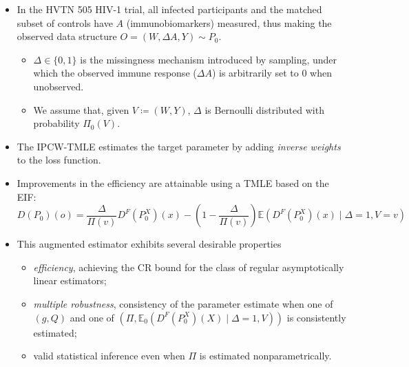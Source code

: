 \documentclass[landscape,a0paper,fontscale=0.285]{baposter} %
\begin{document}
\begin{poster}
{\vspace{-0.35em}
\begin{itemize}
\itemsep0pt
\item In the HVTN 505 HIV-1 trial, all infected participants and the matched
  subset of controls have $A$ (immunobiomarkers) measured, thus making the
  observed data structure \textbf{$O = (W, \Delta A, Y) \sim P_0$}.
  \vspace{-0.25em}
  \begin{itemize}
    \itemsep0pt
    \item $\Delta \in \{0, 1\}$ is the missingness mechanism introduced
      by sampling, under which the observed immune response ($\Delta A$) is
      arbitrarily set to $0$ when unobserved.
    \item We assume that, given $V \coloneqq (W, Y)$, $\Delta$ is Bernoulli
      distributed with probability $\Pi_0(V)$.
  \end{itemize}
\item The IPCW-TMLE \cite{rose2011targeted2sd} estimates the target parameter by
  adding \textit{inverse weights} to the loss function.
\item Improvements in the efficiency are attainable using a TMLE based on the
  EIF:
  $$ D(P_0)(o) = \frac{\Delta}{\Pi(v)} D^F(P_0^X)(x) - \left(1 -
    \frac{\Delta}{\Pi(v)}\right)\mathbb{E}(D^F(P_0^X)(x) \mid \Delta = 1,
    V = v)$$
\item This augmented estimator exhibits several desirable properties
  \vspace{-0.25em}
  \begin{itemize}
    \itemsep0pt
    \item \textit{efficiency}, achieving the CR bound for the class of regular
      asymptotically linear estimators;
    \item \textit{multiple robustness}, consistency of the parameter estimate
      when one of $(g, Q)$ and one of $(\Pi, \mathbb{E}_0(D^F(P_0^X)(X) \mid
      \Delta = 1, V))$ is consistently estimated;
    \item valid statistical inference even when $\Pi$ is estimated
      nonparametrically.
  \end{itemize}
\end{itemize}
}


\end{poster}
\end{document}
